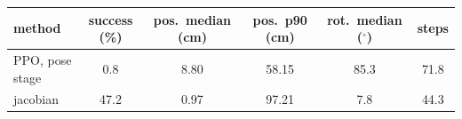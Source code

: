 \begin{tabular}{lccccc}
\hline
method & success (\%) & pos.\ median (cm) & pos.\ p90 (cm) & rot.\ median ($^\circ$) & steps \\
\hline
PPO, pose stage & 0.8 & 8.80 & 58.15 & 85.3 & 71.8 \\
jacobian & 47.2 & 0.97 & 97.21 & 7.8 & 44.3 \\
\hline
\end{tabular}
